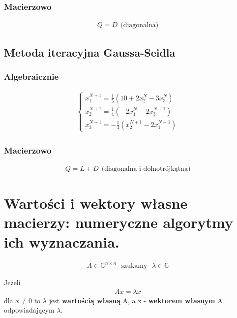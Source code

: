 \documentclass[12pt]{article}
\begin{document}
    \subsubsection{Macierzowo}
    \begin{align*}
        Q = D ~~ \text{(diagonalna)}
    \end{align*}

    \subsection{Metoda iteracyjna Gaussa-Seidla}
    \subsubsection{Algebraicznie}
    \begin{align*}
        \left\{\begin{matrix}
                   x^{N+1}_1 = \frac{1}{5}(10 + 2x^N_2 - 3x^N_3)\\
                   x^{N+1}_2 = \frac{1}{4}(-2x^N_1 - 2x^{N+1}_3)\\
                   x^{N+1}_3 = -\frac{1}{4}(x^{N+1}_2 - 2x^{N+1}_1)
        \end{matrix}\right.
    \end{align*}

    \subsubsection{Macierzowo}
    \begin{align*}
        Q = L + D ~~ \text{(diagonalna i dolnotrójkątna)}
    \end{align*}


    \newpage

    \section{Wartości i wektory własne macierzy: numeryczne algorytmy ich wyznaczania.}
    \begin{align*}
        A \in \mathbb{C}^{n \times n} ~~~ \text{szukamy} ~~~ \lambda \in \mathbb{C}
    \end{align*}
    \begin{definition}
        Jeżeli
        \begin{align*}
            Ax = \lambda x
        \end{align*}
        dla $x \neq 0$ to $\lambda$ jest \textbf{wartością własną} A, a x - \textbf{wektorem własnym}
        A odpowiadającym $\lambda$.
    \end{definition}
\end{document}
